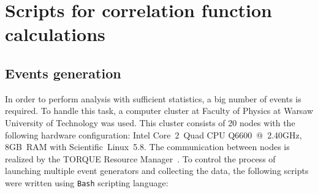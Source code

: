 %
\chapter[Correlation function calculation scripts]{Scripts for correlation function calculations}
\label{a:a}
  \section{Events generation}
    In order to perform analysis with sufficient statistics, a big number of events is required.
    To handle this task, a computer cluster at Faculty of Physics at Warsaw University of Technology was used.
    This cluster consists of 20 nodes with the following hardware configuration: \mbox{Intel\textregistered} \mbox{Core\texttrademark~2 Quad} CPU \mbox{Q6600 @ 2.40GHz,} \mbox{8GB RAM} with Scientific~Linux~5.8.
    The communication between nodes is realized by the TORQUE Resource Manager~\cite{torque}.
    To control the process of launching multiple event generators and collecting the data, the following scripts were written using \verb|Bash| scripting language:
